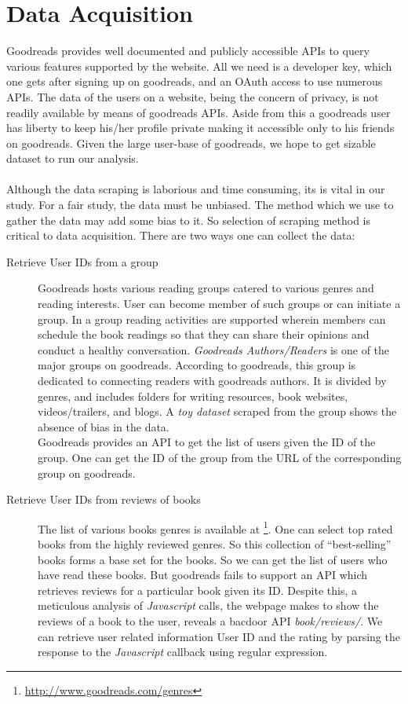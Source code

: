 \documentclass[11pt]{article}
\begin{document}
\section{Data Acquisition}
\label{sec:data_acquisition}
Goodreads provides well documented and publicly accessible APIs to query various features supported by the website. All we need is a developer key, which one gets after signing up on goodreads, and an OAuth access to use numerous APIs. The data of the users on a website, being the concern of privacy, is not readily available by means of goodreads APIs. Aside from this a goodreads user has liberty to keep his/her profile private making it accessible only to his friends on goodreads. Given the large user-base of goodreads, we hope to get sizable dataset to run our analysis.\\\\
Although the data scraping is laborious and time consuming, its is vital in our study. For a fair study, the data must be unbiased. The method which we use to gather the data may add some bias to it. So selection of scraping method is critical to data acquisition. There are two ways one can collect the data:
\begin{description}
\item[Retrieve User IDs from a group]
Goodreads hosts various reading groups catered to various genres and reading interests. User can become member of such groups or can initiate a group. In a group reading activities are supported wherein members can schedule the book readings so that they can share their opinions and conduct a healthy conversation. {\it Goodreads Authors/Readers} is one of the major groups on goodreads.  According to goodreads, this group is dedicated to connecting readers with goodreads authors. It is divided by genres, and includes folders for writing resources, book websites, videos/trailers, and blogs. A {\it toy dataset} scraped from the group shows the absence of bias in the data.\\
Goodreads provides an API to get the list of users given the ID of the group. One can get the ID of the group from the URL of the corresponding group on goodreads.
\item[Retrieve User IDs from reviews of books]
The list of various books genres is available at \footnote{\url{http://www.goodreads.com/genres}}. One can select top rated books from the highly reviewed genres. So this collection of ``best-selling'' books forms a base set for the books. So we can get the list of users who have read these books. But goodreads fails to support an API which retrieves reviews for a particular book given its ID. Despite this, a meticulous analysis of \textit{Javascript} calls, the webpage makes to show the reviews of a book to the user, reveals a bacdoor API \textit{book/reviews/}. We can retrieve user related information User ID and the rating by parsing the response to the \textit{Javascript} callback using regular expression.

\end{description}
\end{document}
